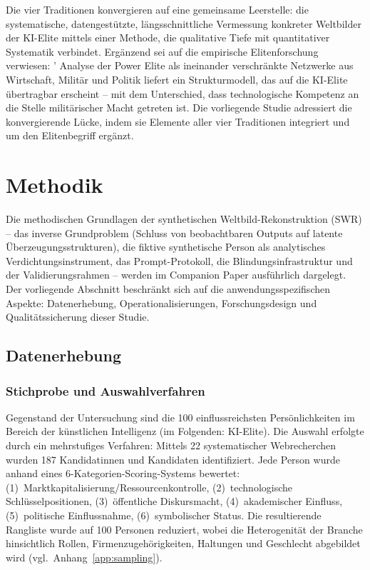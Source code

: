 \documentclass[12pt,a4paper]{article}
\begin{document}
Die vier Traditionen konvergieren auf eine gemeinsame Leerstelle: die systematische, datengest\"utzte, l\"angsschnittliche Vermessung konkreter Weltbilder der KI-Elite mittels einer Methode, die qualitative Tiefe mit quantitativer Systematik verbindet. Erg\"anzend sei auf die empirische Elitenforschung verwiesen: \citeauthor{Mills1956}' Analyse der \glqq Power Elite\grqq{} als ineinander verschr\"ankte Netzwerke aus Wirtschaft, Milit\"ar und Politik liefert ein Strukturmodell, das auf die KI-Elite \"ubertragbar erscheint -- mit dem Unterschied, dass technologische Kompetenz an die Stelle milit\"arischer Macht getreten ist. Die vorliegende Studie adressiert die konvergierende L\"ucke, indem sie Elemente aller vier Traditionen integriert und um den Elitenbegriff erg\"anzt.


\section{Methodik}
\label{sec:methodik}

Die methodischen Grundlagen der synthetischen Weltbild-Rekonstruktion (SWR) -- das inverse Grundproblem (Schluss von beobachtbaren Outputs auf latente \"Uberzeugungsstrukturen), die fiktive synthetische Person als analytisches Verdichtungsinstrument, das Prompt-Protokoll, die Blindungsinfrastruktur und der Validierungsrahmen -- werden im Companion Paper \citep{Geiger2026SWR} ausf\"uhrlich dargelegt. Der vorliegende Abschnitt beschr\"ankt sich auf die anwendungsspezifischen Aspekte: Datenerhebung, Operationalisierungen, Forschungsdesign und Qualit\"atssicherung dieser Studie.


\subsection{Datenerhebung}
\label{sec:methodik:daten}

\subsubsection{Stichprobe und Auswahlverfahren}

Gegenstand der Untersuchung sind die 100 einflussreichsten Pers\"onlichkeiten im Bereich der k\"unstlichen Intelligenz (im Folgenden: KI-Elite). Die Auswahl erfolgte durch ein mehrstufiges Verfahren: Mittels 22 systematischer Webrecherchen wurden 187 Kandidatinnen und Kandidaten identifiziert. Jede Person wurde anhand eines 6-Kategorien-Scoring-Systems bewertet: (1)~Marktkapitalisierung/Ressourcenkontrolle, (2)~technologische Schl\"usselpositionen, (3)~\"offentliche Diskursmacht, (4)~akademischer Einfluss, (5)~politische Einflussnahme, (6)~symbolischer Status. Die resultierende Rangliste wurde auf 100 Personen reduziert, wobei die Heterogenit\"at der Branche hinsichtlich Rollen, Firmenzugeh\"origkeiten, Haltungen und Geschlecht abgebildet wird (vgl.\ Anhang~\ref{app:sampling}).
\end{document}
